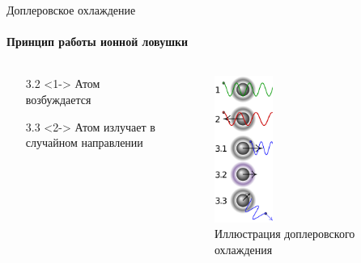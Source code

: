 \documentclass{beamer}
\begin{document}
    \begin{frame}{Доплеровское охлаждение}
    \framesubtitle{Принцип работы ионной ловушки}
        \begin{columns}

        \begin{column}{0.5\textwidth}

            \begin{itemize}
                \item[3.2] <1-> Атом возбуждается
                \item[3.3] <2-> Атом излучает в случайном направлении
            \end{itemize}

        \end{column}

        \begin{column}{0.5\textwidth}
            \begin{figure}
                \centering
                \includegraphics[width=0.35\textwidth]{media/dopler-cooling.png}
                \caption{Иллюстрация доплеровского охлаждения}
            \end{figure}
        \end{column}

        \end{columns}

    \end{frame}
\end{document}
